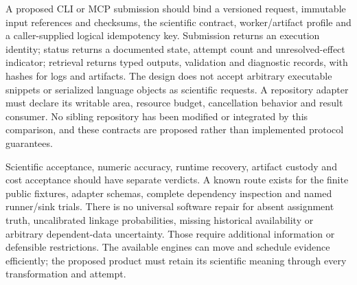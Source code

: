 A proposed CLI or MCP submission should bind a versioned request, immutable input references and checksums, the scientific contract, worker/artifact profile and a caller-supplied logical idempotency key. Submission returns an execution identity; status returns a documented state, attempt count and unresolved-effect indicator; retrieval returns typed outputs, validation and diagnostic records, with hashes for logs and artifacts. The design does not accept arbitrary executable snippets or serialized language objects as scientific requests. A repository adapter must declare its writable area, resource budget, cancellation behavior and result consumer. No sibling repository has been modified or integrated by this comparison, and these contracts are proposed rather than implemented protocol guarantees.~\citep{exec24_openlineage_source,exec24_openlineage_reference,exec25_dww_choice}

Scientific acceptance, numeric accuracy, runtime recovery, artifact custody and cost acceptance should have separate verdicts. A known route exists for the finite public fixtures, adapter schemas, complete dependency inspection and named runner/sink trials. There is no universal software repair for absent assignment truth, uncalibrated linkage probabilities, missing historical availability or arbitrary dependent-data uncertainty. Those require additional information or defensible restrictions. The available engines can move and schedule evidence efficiently; the proposed product must retain its scientific meaning through every transformation and attempt.~\citep{exec25_dww_choice}
